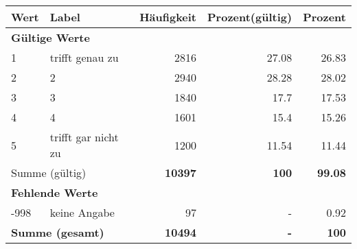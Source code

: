      \begin{longtable}{lXrrr}
     \toprule
     \textbf{Wert} & \textbf{Label} & \textbf{Häufigkeit} & \textbf{Prozent(gültig)} & \textbf{Prozent} \\
     \endhead
     \midrule
     \multicolumn{5}{l}{\textbf{Gültige Werte}}\\

     1 &
     \multicolumn{1}{X}{ trifft genau zu   } &


       \num{2816} &
       \num[round-mode=places,round-precision=2]{27,08} &
         \num[round-mode=places,round-precision=2]{26,83} \\

     2 &
     \multicolumn{1}{X}{ 2   } &


       \num{2940} &
       \num[round-mode=places,round-precision=2]{28,28} &
         \num[round-mode=places,round-precision=2]{28,02} \\

     3 &
     \multicolumn{1}{X}{ 3   } &


       \num{1840} &
       \num[round-mode=places,round-precision=2]{17,7} &
         \num[round-mode=places,round-precision=2]{17,53} \\

     4 &
     \multicolumn{1}{X}{ 4   } &


       \num{1601} &
       \num[round-mode=places,round-precision=2]{15,4} &
         \num[round-mode=places,round-precision=2]{15,26} \\

     5 &
     \multicolumn{1}{X}{ trifft gar nicht zu   } &


       \num{1200} &
       \num[round-mode=places,round-precision=2]{11,54} &
         \num[round-mode=places,round-precision=2]{11,44} \\
     \midrule
     \multicolumn{2}{l}{Summe (gültig)} &
       \textbf{\num{10397}} &
     \textbf{100} &
       \textbf{\num[round-mode=places,round-precision=2]{99,08}} \\
     \multicolumn{5}{l}{\textbf{Fehlende Werte}}\\
       -998 &
       keine Angabe &
         \num{97} &
        - &
         \num[round-mode=places,round-precision=2]{0,92} \\
     \midrule
     \multicolumn{2}{l}{\textbf{Summe (gesamt)}} &
          \textbf{\num{10494}} &
        \textbf{-} &
        \textbf{100} \\
     \bottomrule
     \end{longtable}
     
